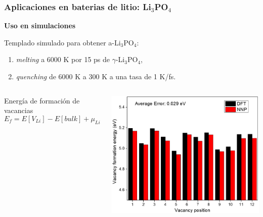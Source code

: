 \documentclass[aspectratio=169]{beamer}
\let\oldtextbf\textbf
\renewcommand{\textbf}[1]{\textcolor{nordblue}{\oldtextbf{#1}}}
\begin{document}
    \begin{frame}
        \frametitle{Aplicaciones en baterias de litio: Li$_3$PO$_4$}
         
        \textbf{Uso en simulaciones}

        Templado simulado para obtener a-Li$_3$PO$_4$:
        \begin{enumerate}
            \item \textit{melting} a 6000 K por 15 ps de $\gamma$-Li$_3$PO$_4$, 
            \item \textit{quenching} de 6000 K a 300 K a una tasa de 1 K/fs.
        \end{enumerate}

        \pause

        \begin{columns}
            Energía de formación de vacancias
            $$
            E_f = E[V_{Li}] - E[bulk] + \mu_{Li}
            $$

            \pause 

            \begin{center}
                \includegraphics[width=0.8\columnwidth]{Li3PO4-vacancias.png}
            \end{center}
        \end{columns}

    \end{frame}
    
\end{document}
